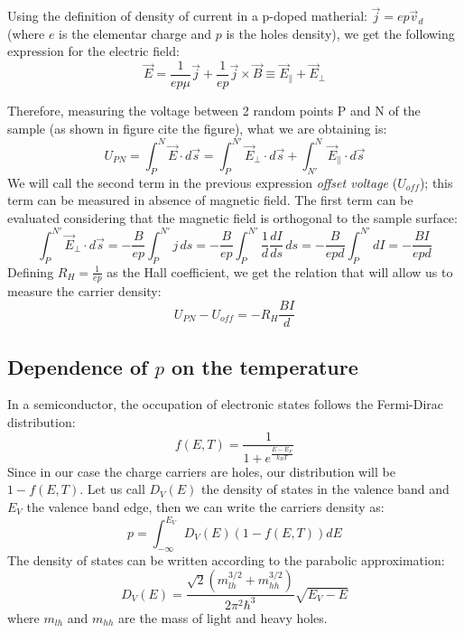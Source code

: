 \documentclass[11pt,a4paper]{article}
\begin{document}
Using the definition of density of current in a p-doped matherial: $\vec{j}=ep\vec{v}_d$ (where $e$ is the elementar charge and $p$ is the holes density), we get the following expression for the electric field:
\begin{equation}
\vec{E}=\frac{1}{ep\mu}\vec{j}+\frac{1}{ep}\vec{j}\times\vec{B}\equiv \vec{E}_\parallel+\vec{E}_\perp
\end{equation}

Therefore, measuring the voltage between 2 random points P and N of the sample (as shown in figure {\tiny cite the figure}), what we are obtaining is:
\begin{equation}
U_{PN}=\int_P^N\vec{E}\cdot d\vec{s}=\int_P^{N'}\vec{E}_\perp\cdot d\vec{s}+\int_{N'}^N\vec{E}_\parallel\cdot d\vec{s}
\end{equation}
We will call the second term in the previous expression \emph{offset voltage} ($U_{off}$); this term can be measured in absence of magnetic field. The first term can be evaluated considering that the magnetic field is orthogonal to the sample surface:
\begin{equation}
\int_P^{N'}\vec{E}_\perp\cdot d\vec{s}=-\frac{B}{ep}\int_P^{N'}j\, ds=-\frac{B}{ep}\int_P^{N'}\frac{1}{d}\frac{dI}{ds}\, ds=-\frac{B}{epd}\int_P^{N'} dI=-\frac{BI}{epd}
\end{equation}
Defining $R_H=\frac{1}{ep}$ as the Hall coefficient, we get the relation that will allow us to measure the carrier density:
\begin{equation}
U_{PN}-U_{off}=-R_H\frac{BI}{d}
\end{equation}

\subsection{Dependence of $p$ on the temperature}

In a semiconductor, the occupation of electronic states follows the Fermi-Dirac distribution:
\begin{equation*}
f(E,T)=\frac{1}{1+e^{\frac{E-E_F}{k_BT}}}
\end{equation*}
Since in our case the charge carriers are holes, our distribution will be $1-f(E,T)$. Let us call $D_V(E)$ the density of states in the valence band and $E_V$ the valence band edge, then we can write the carriers density as:
\begin{equation}
p=\int_{-\infty}^{E_V}D_V(E)(1-f(E,T))dE
\end{equation}
The density of states can be written according to the parabolic approximation:
\begin{equation*}
D_V(E)=\frac{\sqrt{2}(m_{lh}^{3/2}+m_{hh}^{3/2})}{2\pi^2\hbar^3}\sqrt{E_V-E}
\end{equation*} where $m_{lh}$ and $m_{hh}$ are the mass of light and heavy holes.
\end{document}
